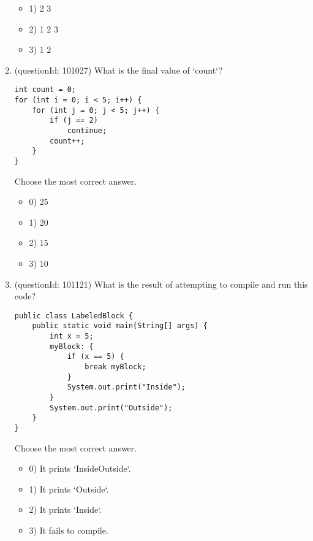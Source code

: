 \documentclass[12pt]{article}
\begin{document}
\begin{enumerate}[label=(\arabic*)]
\begin{itemize}
\item 1) 2 3

\item 2) 1 2 3

\item 3) 1 2

\end{itemize}
\item (questionId: 101027) What is the final value of `count`?\n\begin{verbatim}
int count = 0;
for (int i = 0; i < 5; i++) {
    for (int j = 0; j < 5; j++) {
        if (j == 2)
            continue;
        count++;
    }
}
\end{verbatim}
Choose the most correct answer. 
\begin{itemize}
\item 0) 25

\item 1) 20

\item 2) 15

\item 3) 10

\end{itemize}
\item (questionId: 101121) What is the result of attempting to compile and run this code?\n\begin{verbatim}
public class LabeledBlock {
    public static void main(String[] args) {
        int x = 5;
        myBlock: {
            if (x == 5) {
                break myBlock;
            }
            System.out.print("Inside");
        }
        System.out.print("Outside");
    }
}
\end{verbatim}
Choose the most correct answer. 
\begin{itemize}
\item 0) It prints `InsideOutside`.

\item 1) It prints `Outside`.

\item 2) It prints `Inside`.

\item 3) It fails to compile.

\end{itemize}

\end{enumerate}
\end{document}
